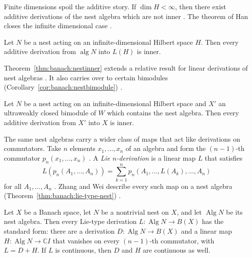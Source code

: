 Finite dimensions spoil the additive story. If $\dim H<\infty$, then there
exist additive derivations of the nest algebra which are not inner
\cite[p.~1165]{HanDeguang1993Nest}. The theorem of Han closes the infinite
dimensional case \cite[Theorem~2.5, p.~1168]{HanDeguang1993Nest}.

\begin{theorem}\label{thm:banach:nestinner}
Let $N$ be a nest acting on an infinite-dimensional Hilbert space $H$.
Then every additive derivation from $\operatorname{alg}N$ into $L(H)$ is
inner.
\end{theorem}

Theorem~\ref{thm:banach:nestinner} extends a relative result for linear
derivations of nest algebras \cite[p.~1165]{HanDeguang1993Nest}. It also
carries over to certain bimodules (Corollary~\ref{cor:banach:nestbimodule})
\cite[Corollary~2.6, p.~1169]{HanDeguang1993Nest}.\begin{corollary}\label{cor:banach:nestbimodule}
Let $N$ be a nest acting on an infinite-dimensional Hilbert space and
$X'$ an ultraweakly closed bimodule of $W$ which contains the nest
algebra. Then every additive derivation from $X'$ into $X$ is inner.
\end{corollary}

The same nest algebras carry a wider class of maps that act like derivations
on commutators. Take $n$ elements $x_{1},\dots,x_{n}$ of an algebra and form
the $(n-1)$-th commutator $p_{n}(x_{1},\dots,x_{n})$
\cite[p.~1]{ZhangWei2017}. A \emph{Lie $n$-derivation} is a linear map $L$
that satisfies
\[
L(p_{n}(A_{1},\dots,A_{n}))=\sum_{k=1}^{n}p_{n}(A_{1},\dots,L(A_{k}),\dots,A_{n})
\]
for all $A_{1},\dots,A_{n}$ \cite[p.~1]{ZhangWei2017}. Zhang and Wei describe
every such map on a nest algebra (Theorem~\ref{thm:banach:lie-type-nest})
\cite[Theorem~3.1, p.~6]{ZhangWei2017}.\begin{theorem}\label{thm:banach:lie-type-nest}
Let $X$ be a Banach space, let $N$ be a nontrivial nest on $X$, and let
$\operatorname{Alg}N$ be its nest algebra. Then every Lie-type derivation
$L\colon\operatorname{Alg}N\to B(X)$ has the standard form: there are a
derivation $D\colon\operatorname{Alg}N\to B(X)$ and a linear map
$H\colon\operatorname{Alg}N\to\mathbb{C}I$ that vanishes on every
$(n-1)$-th commutator, with $L=D+H$. If $L$ is continuous, then $D$ and $H$
are continuous as well.
\end{theorem}

